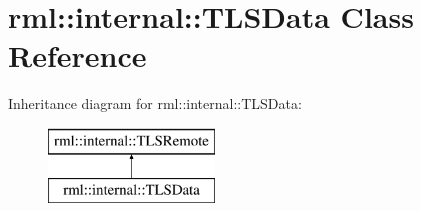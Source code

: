 \hypertarget{classrml_1_1internal_1_1TLSData}{}\section{rml\+:\+:internal\+:\+:T\+L\+S\+Data Class Reference}
\label{classrml_1_1internal_1_1TLSData}
Inheritance diagram for rml\+:\+:internal\+:\+:T\+L\+S\+Data\+:\begin{figure}[H]
\begin{center}
\leavevmode
\includegraphics[height=2.000000cm]{classrml_1_1internal_1_1TLSData}
\end{center}
\end{figure}
